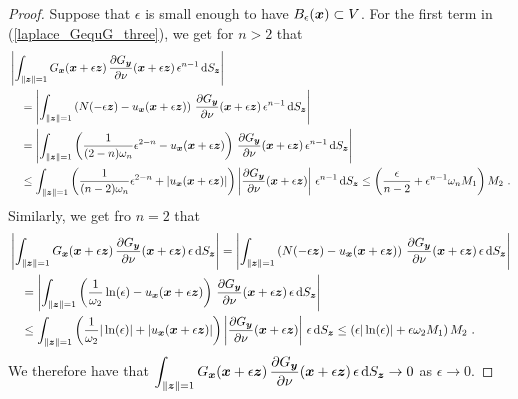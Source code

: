 \begin{proof}
Suppose that $\epsilon$ is small enough to have
$B_\epsilon({\bm{x}}) \subset V$.
For the first term in (\ref{laplace_GequG_three}),
we get for $n>2$ that
\begin{align*}
&\left| \int_{\|{\bm{z}}\|=1}
G_{{\bm{x}}}({\bm{x}}+\epsilon {\bm{z}})
\,\frac{\partial{G_{{\bm{y}}}}}{\partial \nu}({\bm{x}}+\epsilon {\bm{z}})
\, \epsilon^{n-1} \,\mathrm{d}{S}_{{\bm{z}}} \right| \\
&\quad = \left| \int_{\|{\bm{z}}\|=1}
\left( N(-\epsilon{\bm{z}}) - u_{{\bm{x}}}({\bm{x}} + \epsilon {\bm{z}}) \right)
\,\frac{\partial{G_{{\bm{y}}}}}{\partial \nu}({\bm{x}}+\epsilon {\bm{z}})
\,\epsilon^{n-1} \,\mathrm{d}{S}_{{\bm{z}}} \right| \\
&\quad = \left| \int_{\|{\bm{z}}\|=1}
\left( \frac{1}{(2-n)\omega_n} \epsilon^{2-n} -
u_{{\bm{x}}}({\bm{x}} + \epsilon {\bm{z}})  \right)
\,\frac{\partial{G_{{\bm{y}}}}}{\partial \nu}({\bm{x}} + \epsilon {\bm{z}})
\, \epsilon^{n-1} \,\mathrm{d}{S}_{{\bm{z}}} \right| \\
&\quad \leq \int_{\|{\bm{z}}\|=1}
\left( \frac{1}{(n-2)\omega_n} \epsilon^{2-n} +
\left| u_{{\bm{x}}}({\bm{x}} + \epsilon {\bm{z}}) \right| \right)
\left| \frac{\partial{G_{{\bm{y}}}}}{\partial \nu}({\bm{x}} + \epsilon {\bm{z}})
\right|\, \epsilon^{n-1} \,\mathrm{d}{S}_{{\bm{z}}} \leq \left(\frac{\epsilon}{n-2} +
\epsilon^{n-1} \omega_n M_1\right) M_2 \ . 
\end{align*}
Similarly, we get fro $n=2$ that
\begin{align*}
&\left| \int_{\|{\bm{z}}\|=1}
G_{{\bm{x}}}({\bm{x}}+\epsilon {\bm{z}})
\,\frac{\partial{G_{{\bm{y}}}}}{\partial \nu}({\bm{x}}+\epsilon {\bm{z}})
\, \epsilon \,\mathrm{d}{S}_{{\bm{z}}} \right|
= \left| \int_{\|{\bm{z}}\|=1}
\left( N(-\epsilon{\bm{z}}) - u_{{\bm{x}}}({\bm{x}} + \epsilon {\bm{z}}) \right)
\,\frac{\partial{G_{{\bm{y}}}}}{\partial \nu}({\bm{x}}+\epsilon {\bm{z}})
\, \epsilon \,\mathrm{d}{S}_{{\bm{z}}} \right| \\
&\quad = \left| \int_{\|{\bm{z}}\|=1}
\left( \frac{1}{\omega_2} \ln(\epsilon) -
u_{{\bm{x}}}({\bm{x}} + \epsilon {\bm{z}}) \right)
\,\frac{\partial{G_{{\bm{y}}}}}{\partial \nu}({\bm{x}} + \epsilon {\bm{z}})
\, \epsilon \,\mathrm{d}{S}_{{\bm{z}}} \right| \\
&\quad \leq \int_{\|{\bm{z}}\|=1}
\left( \frac{1}{\omega_2} |\ln(\epsilon)|  +
\left| u_{{\bm{x}}}({\bm{x}} + \epsilon {\bm{z}}) \right| \right)
\left| \frac{\partial{G_{{\bm{y}}}}}{\partial \nu}({\bm{x}} + \epsilon {\bm{z}})
\right|\, \epsilon \,\mathrm{d}{S}_{{\bm{z}}}
\leq \left( \epsilon |\ln(\epsilon)| + \epsilon \omega_2 M_1 \right) M_2 \ . 
\end{align*}
We therefore have that
$\displaystyle \int_{\|{\bm{z}}\|=1}
G_{{\bm{x}}}({\bm{x}}+\epsilon {\bm{z}})
\,\frac{\partial{G_{{\bm{y}}}}}{\partial \nu}({\bm{x}}+\epsilon {\bm{z}})
\, \epsilon \,\mathrm{d}{S}_{{\bm{z}}} \to 0$ 
as $\epsilon \to 0$.


\end{proof}
